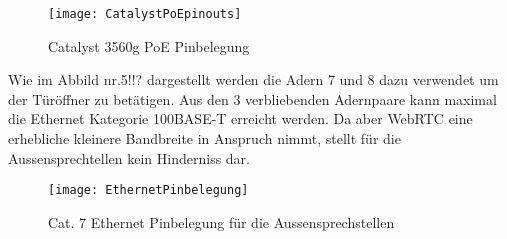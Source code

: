 \begin{figure}[htb!]
	\begin{center}
		\texttt{[image: CatalystPoEpinouts]}
		\caption[Catalyst Pinouts]{Catalyst 3560g PoE Pinbelegung}
		\label{fig:catalystPinouts}
	\end{center}
\end{figure}

Wie im Abbild nr.5!!? dargestellt werden die Adern 7 und 8 dazu verwendet um der Türöffner zu betätigen. Aus den 3 verbliebenden Adernpaare kann maximal die Ethernet Kategorie 100BASE-T erreicht werden. Da aber WebRTC eine erhebliche kleinere Bandbreite in Anspruch nimmt, stellt für die Aussensprechtellen kein Hinderniss dar.

\begin{figure}[htb!]
	\begin{center}
		\texttt{[image: EthernetPinbelegung]}
		\caption[EthernetPinbelegung]{Cat. 7 Ethernet Pinbelegung für die Aussensprechstellen}
		\label{fig:catalystPinouts}
	\end{center}
\end{figure}


\newpage